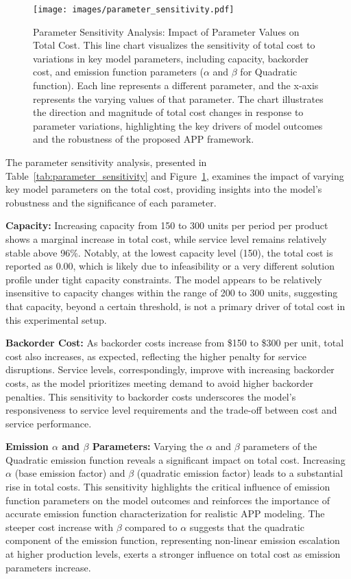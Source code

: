 \begin{table}[htbp]
\begin{table}[htbp]
\begin{table}[htbp]
\begin{table}[htbp]
\begin{figure}[htbp]
    \centering
    \texttt{[image: images/parameter\_sensitivity.pdf]}
    \caption{Parameter Sensitivity Analysis: Impact of Parameter Values on Total Cost.
    This line chart visualizes the sensitivity of total cost to variations in key model parameters, including capacity, backorder cost, and emission function parameters ($\alpha$ and $\beta$ for Quadratic function).  Each line represents a different parameter, and the x-axis represents the varying values of that parameter. The chart illustrates the direction and magnitude of total cost changes in response to parameter variations, highlighting the key drivers of model outcomes and the robustness of the proposed APP framework.}
    \label{fig:parameter_sensitivity_line}
\end{figure}

The parameter sensitivity analysis, presented in Table~\ref{tab:parameter_sensitivity} and Figure~\ref{fig:parameter_sensitivity_line}, examines the impact of varying key model parameters on the total cost, providing insights into the model's robustness and the significance of each parameter.

\textbf{Capacity:} Increasing capacity from 150 to 300 units per period per product shows a marginal increase in total cost, while service level remains relatively stable above 96\%.  Notably, at the lowest capacity level (150), the total cost is reported as 0.00, which is likely due to infeasibility or a very different solution profile under tight capacity constraints.  The model appears to be relatively insensitive to capacity changes within the range of 200 to 300 units, suggesting that capacity, beyond a certain threshold, is not a primary driver of total cost in this experimental setup.

\textbf{Backorder Cost:} As backorder costs increase from \$150 to \$300 per unit, total cost also increases, as expected, reflecting the higher penalty for service disruptions.  Service levels, correspondingly, improve with increasing backorder costs, as the model prioritizes meeting demand to avoid higher backorder penalties.  This sensitivity to backorder costs underscores the model's responsiveness to service level requirements and the trade-off between cost and service performance.

\textbf{Emission $\alpha$ and $\beta$ Parameters:}  Varying the $\alpha$ and $\beta$ parameters of the Quadratic emission function reveals a significant impact on total cost.  Increasing $\alpha$ (base emission factor) and $\beta$ (quadratic emission factor) leads to a substantial rise in total costs.  This sensitivity highlights the critical influence of emission function parameters on the model outcomes and reinforces the importance of accurate emission function characterization for realistic APP modeling.  The steeper cost increase with $\beta$ compared to $\alpha$ suggests that the quadratic component of the emission function, representing non-linear emission escalation at higher production levels, exerts a stronger influence on total cost as emission parameters increase.


\end{table}
\end{table}
\end{table}
\end{table}
